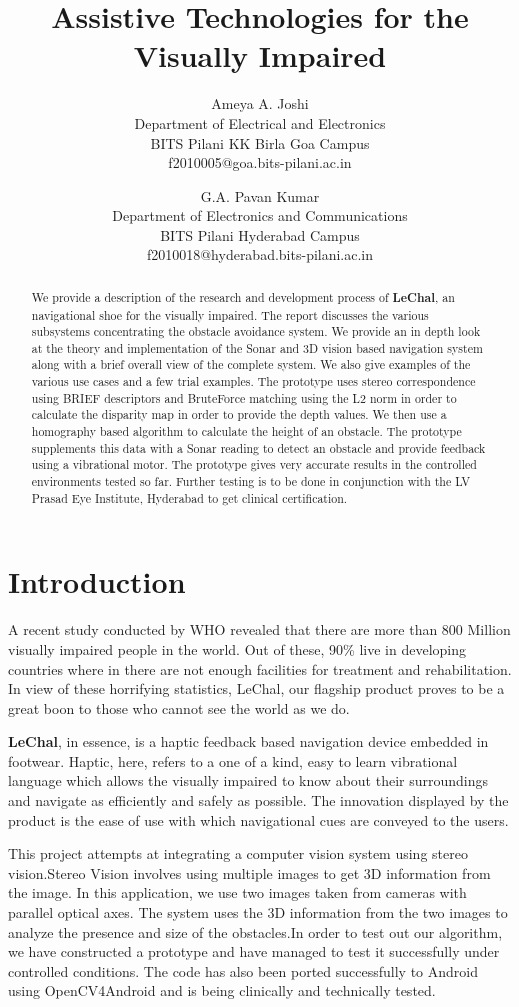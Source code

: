 \documentclass[11pt]{report}
\title{Assistive Technologies for the Visually Impaired}
\author{Ameya A. Joshi\\Department of Electrical and Electronics\\ BITS Pilani KK Birla Goa Campus\\f2010005@goa.bits-pilani.ac.in
\and
 G.A. Pavan Kumar\\
 Department of Electronics and Communications\\
 BITS Pilani Hyderabad Campus\\
 f2010018@hyderabad.bits-pilani.ac.in}
\begin{document}
\maketitle

\begin{abstract}
We provide a description of the research  and development process of \textbf{LeChal}, an navigational shoe for the visually impaired. The report discusses the various subsystems concentrating the obstacle avoidance system. We provide an in depth look at the theory and implementation of the Sonar and 3D vision based navigation system along with a brief overall view of the complete system. We also give examples of the various use cases and a few trial examples. The prototype uses stereo correspondence using BRIEF\cite{brief} descriptors and BruteForce matching using the L2 norm in order to calculate the disparity map in order to provide the depth values. We then use a homography based algorithm to calculate the height of an obstacle\cite{obstacleavoidance}. The prototype supplements this data with a Sonar reading to detect an obstacle and provide feedback using a vibrational motor. The prototype gives very accurate results in the controlled environments tested so far. Further testing is to be done in conjunction with the LV Prasad Eye Institute, Hyderabad to get clinical certification.     
\end{abstract}
\tableofcontents
\listoffigures
\chapter{Introduction}
A recent study conducted by WHO\cite{who} revealed that there are more than 800 Million visually impaired people in the world. Out of these, 90\% live in  developing countries 
where in there are not enough facilities for treatment and rehabilitation. In view of these horrifying statistics, LeChal\cite{lechal}, our flagship product proves to be a great boon to those who cannot see the world as we do.  

\textbf{LeChal}, in essence, is a haptic feedback based navigation device embedded in footwear. Haptic, here, refers to a one of a kind, easy to learn vibrational language which allows the visually impaired to know about their surroundings and navigate as efficiently and safely as possible. The innovation displayed by the product is the ease of use with which navigational cues are conveyed to the users. 

This project attempts at integrating a computer vision system using stereo vision.Stereo Vision\cite{gonzalez,HOGDisp} involves using multiple images to get 3D information from the image. In this application, we use two images taken from cameras with parallel optical axes. The system uses the 3D information from the two images to analyze the presence and size of the obstacles.In order to test out our algorithm, we have constructed a prototype and have managed to test it successfully under controlled conditions. The code has also been ported successfully to Android using OpenCV4Android\cite{Opencvandroid} and is being clinically and technically tested. 
\end{document}
